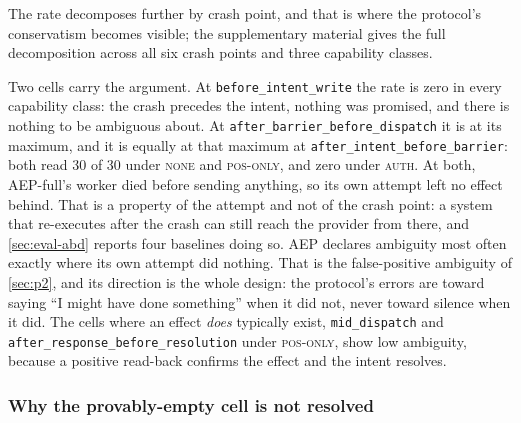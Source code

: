 The rate decomposes further by crash point, and that is where the protocol's
conservatism becomes visible; the supplementary material gives the full
decomposition across all six crash points and three capability classes.

Two cells carry the argument. At \texttt{before\_intent\_write} the rate is
zero in every capability class: the crash precedes the intent, nothing was
promised, and there is nothing to be ambiguous about. At
\texttt{after\_barrier\_before\_dispatch} it is at its maximum, and it is
equally at that maximum at \texttt{after\_intent\_before\_barrier}: both read
30 of 30 under \textsc{none} and \textsc{pos-only}, and zero under
\textsc{auth}. At both, AEP-full's worker died before sending anything, so its
own attempt left no effect behind. That is a property of the attempt and not
of the crash point: a system that re-executes after the crash can still reach
the provider from there, and \cref{sec:eval-abd} reports four baselines doing
so. AEP declares ambiguity most often exactly where its own attempt did
nothing. That is the false-positive ambiguity
of \cref{sec:p2}, and its direction is the whole design: the protocol's errors
are toward saying ``I might have done something'' when it did not, never toward
silence when it did. The cells where an effect \emph{does} typically exist,
\texttt{mid\_dispatch} and \texttt{after\_response\_before\_resolution} under
\textsc{pos-only}, show low ambiguity, because a positive read-back
confirms the effect and the intent resolves.

\subsubsection{Why the provably-empty cell is not resolved}
\label{sec:eval-provable}

